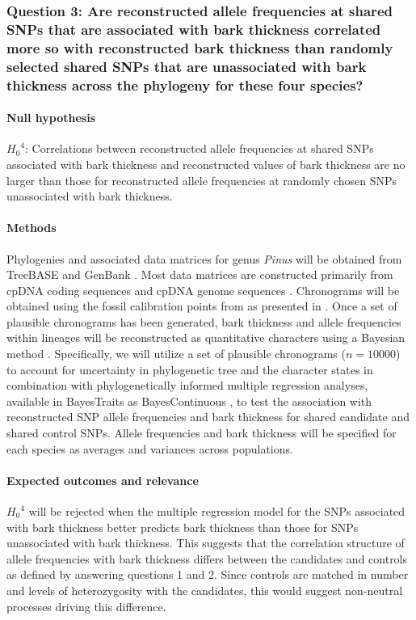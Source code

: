 \subsubsection*{Question 3: Are reconstructed allele frequencies at shared SNPs that are associated with bark thickness 
correlated more so with reconstructed bark thickness than randomly selected shared SNPs that are unassociated with bark 
thickness across the phylogeny for these four species?}

\paragraph{Null hypothesis} ${H_0}^4$: Correlations between reconstructed allele frequencies at shared SNPs associated with 
bark thickness and reconstructed values of bark thickness are no larger than those for reconstructed allele frequencies at 
randomly chosen SNPs unassociated with bark thickness.

\paragraph{Methods} Phylogenies and associated data matrices for genus \emph{Pinus} will be obtained from 
TreeBASE \citep{Morell:to} and GenBank \citep{Benson:2012kf}. Most data matrices are constructed primarily from 
cpDNA coding sequences \citep{Eckert:2006iw, Gernandt:2008df} and cpDNA genome sequences \citep{Parks:2009bd}. 
Chronograms will be obtained using the fossil calibration points from \citet{Willyard:2007in} as presented in \citet{He:2012bz}. 
Once a set of plausible chronograms has been 
generated, bark thickness and allele frequencies within lineages will be reconstructed as quantitative 
characters using a Bayesian method \citep{Pagel:2004ic}.
Specifically, we will utilize a set of plausible chronograms ($n =  \num{10000}$) to account for uncertainty in 
phylogenetic tree and the character states in combination with phylogenetically informed multiple 
regression analyses, available in BayesTraits as BayesContinuous \citep{Pagel:2004ic},  to test the association with 
reconstructed SNP allele frequencies and bark thickness for shared candidate and shared control SNPs. 
Allele frequencies and bark thickness will be specified for each species as averages and variances across populations.

\paragraph{Expected outcomes and relevance} ${H_0}^4$ will be rejected when the multiple regression model for the 
SNPs associated with bark thickness better predicts bark thickness than those for SNPs unassociated with bark thickness. 
This suggests that the correlation structure of allele frequencies with bark thickness differs between the candidates and controls 
as defined by answering questions 1 and 2. Since controls are matched in number and levels of heterozygosity with the candidates, 
this would suggest non-neutral processes driving this difference.

